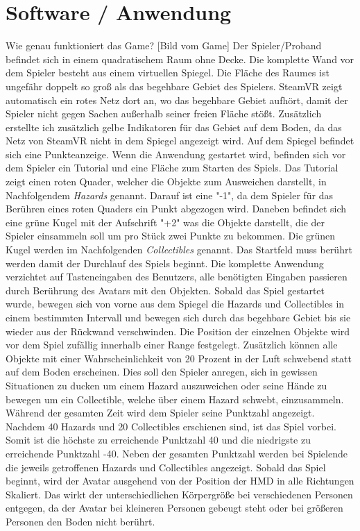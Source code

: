\section{Software / Anwendung}
Wie genau funktioniert das Game?
[Bild vom Game]
Der Spieler/Proband befindet sich in einem quadratischem Raum ohne Decke. Die komplette Wand vor dem Spieler besteht aus einem virtuellen Spiegel. Die Fläche des Raumes ist ungefähr doppelt so groß als das begehbare Gebiet des Spielers. SteamVR zeigt automatisch ein rotes Netz dort an, wo das begehbare Gebiet aufhört, damit der Spieler nicht gegen Sachen außerhalb seiner freien Fläche stößt. Zusätzlich erstellte ich zusätzlich gelbe Indikatoren für das Gebiet auf dem Boden, da das Netz von SteamVR nicht in dem Spiegel angezeigt wird. Auf dem Spiegel befindet sich eine Punkteanzeige.
Wenn die Anwendung gestartet wird, befinden sich vor dem Spieler ein Tutorial und eine Fläche zum Starten des Spiels. Das Tutorial zeigt einen roten Quader, welcher die Objekte zum Ausweichen darstellt, in Nachfolgendem \textit{Hazards} genannt. Darauf ist eine "-1", da dem Spieler für das Berühren eines roten Quaders ein Punkt abgezogen wird. Daneben befindet sich eine grüne Kugel mit der Aufschrift "+2" was die Objekte darstellt, die der Spieler einsammeln soll um pro Stück zwei Punkte zu bekommen. Die grünen Kugel werden im Nachfolgenden \textit{Collectibles} genannt.
Das Startfeld muss berührt werden damit der Durchlauf des Spiels beginnt. Die komplette Anwendung verzichtet auf Tasteneingaben des Benutzers, alle benötigten Eingaben passieren durch Berührung des Avatars mit den Objekten.
Sobald das Spiel gestartet wurde, bewegen sich von vorne aus dem Spiegel die Hazards und Collectibles in einem bestimmten Intervall und bewegen sich durch das begehbare Gebiet bis sie wieder aus der Rückwand verschwinden. Die Position der einzelnen Objekte wird vor dem Spiel zufällig innerhalb einer Range festgelegt. Zusätzlich können alle Objekte mit einer Wahrscheinlichkeit von 20 Prozent in der Luft schwebend statt auf dem Boden erscheinen. Dies soll den Spieler anregen, sich in gewissen Situationen zu ducken um einem Hazard auszuweichen oder seine Hände zu bewegen um ein Collectible, welche über einem Hazard schwebt, einzusammeln. Während der gesamten Zeit wird dem Spieler seine Punktzahl angezeigt. Nachdem 40 Hazards und 20 Collectibles erschienen sind, ist das Spiel vorbei. Somit ist die höchste zu erreichende Punktzahl 40 und die niedrigste zu erreichende Punktzahl -40. Neben der gesamten Punktzahl werden bei Spielende die jeweils getroffenen Hazards und Collectibles angezeigt.
Sobald das Spiel beginnt, wird der Avatar ausgehend von der Position der HMD in alle Richtungen Skaliert. Das wirkt der unterschiedlichen Körpergröße bei verschiedenen Personen entgegen, da der Avatar bei kleineren Personen gebeugt steht oder bei größeren Personen den Boden nicht berührt.


